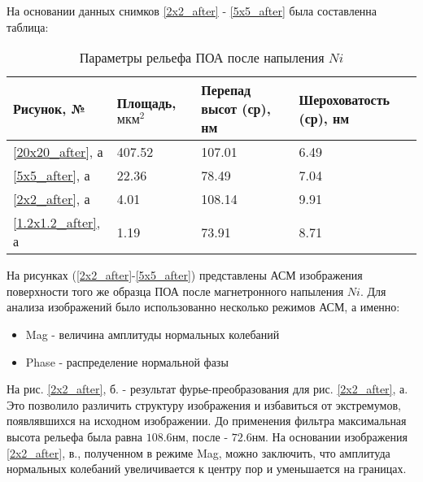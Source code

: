 

\clearpage

На основании данных снимков \ref{2x2_after} - \ref{5x5_after} была составленна таблица:

\begin{table}[H]
    \caption{Параметры рельефа ПОА после напыления $Ni$}\label{table_after}
    \begin{tabular}{|l|l|l|l|}
    \hline Рисунок, № & Площадь, $\text{мкм}^2$ & Перепад высот (ср), нм & Шероховатость  (ср), нм \\
    \hline \ref{20x20_after}, а & 407.52 & 107.01 & 6.49 \\
    \hline \ref{5x5_after}, а & 22.36 & 78.49 & 7.04 \\
    \hline \ref{2x2_after}, а & 4.01 & 108.14 & 9.91 \\
    \hline \ref{1.2x1.2_after}, а & 1.19 & 73.91 & 8.71 \\
    \hline
    \end{tabular}
\end{table}

На рисунках (\ref{2x2_after}-\ref{5x5_after}) представлены АСМ изображения поверхности того же образца ПОА после магнетронного напыления $Ni$. Для анализа изображений было использованно несколько режимов АСМ, а именно:

\begin{itemize}
    \item Mag - величина амплитуды нормальных колебаний
    \item Phase - распределение нормальной фазы
\end{itemize}

На рис. \ref{2x2_after}, б. - результат фурье-преобразования для рис. \ref{2x2_after}, а. Это позволило различить структуру изображения и избавиться от экстремумов, появлявшихся на исходном изображении. До применения фильтра максимальная высота рельефа была равна $108.6 \text{нм}$, после - $72.6 \text{нм}$. На основании изображения \ref{2x2_after}, в., полученном в режиме Mag, можно заключить, что  амплитуда нормальных колебаний увеличивается к центру пор и уменьшается на границах.

